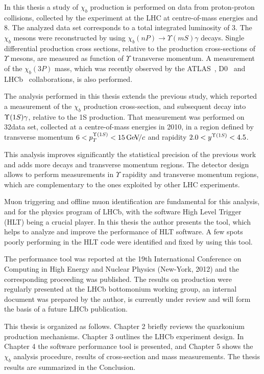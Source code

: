 In this thesis a study of $\chi_b$ production is performed on data from proton-proton collisions, 
collected by the \lhcb experiment at the LHC at centre-of-mass energies 
 and 8\tev. The analyzed data set corresponds to a total integrated luminosity
of 3\invfb. The $\chi_b$ mesons were reconstructed by using 
$\chi_b(nP)\rightarrow\Upsilon(mS)\gamma$ decays. Single differential
production cross sections, relative to the production cross-sections of
$\Upsilon$ mesons, are measured as function of $\Upsilon$ transverse momentum.
A measurement of the $\chi_b(3P)$ mass, which was recently observed by the 
ATLAS~\cite{Aad:2011ih}, D0~\cite{Abazov:2012gh} and
LHCb~\cite{LHCb-CONF-2012-020} collaborations, is also performed.

The analysis performed in this thesis extends the previous \lhcb
study\cite{LHCb-PAPER-2012-015}, which reported a measurement of the $\chi_b$
production cross-section, and subsequent decay into $\Y1S \gamma$, relative
to the \Y1S production. That measurement was performed on 32\invpb data set,
collected at a centre-of-mass energies \tev in 2010,  in a region defined by
transverse momentum $6  < p_{T}^{\Y1S} < 15 \gevc$ and rapidity  $2.0 <
y^{\Y1S} < 4.5$. 

This analysis improves significantly the statistical precision of the previous work and 
adds more decays and transverse momentum regions. The
\lhcb detector design allows to perform measurements in $\Upsilon$ rapidity and 
transverse momentum regions, which are complementary to the ones exploited 
by other LHC experiments. 

Muon triggering and offline muon identification are fundamental for this analysis, and 
for the physics program of LHCb, with the software High Level Trigger (HLT) being 
a crucial player. In this thesis the author presents the tool, which helps to
analyze and improve the performance of HLT software. A few spots poorly performing 
in the HLT code were identified and fixed by using this tool.

The performance tool was reported at the 19th International
Conference on Computing in High Energy and Nuclear Physics (New-York, 2012) and
the corresponding proceeding was published\cite{aprofiler}. The results on
\chib production were regularly presented at the LHCb bottomonium working group,
an internal document was prepared by the author, is currently under review and will form 
the basis of a future LHCb publication.

This thesis is organized as follows. Chapter 2 briefly reviews the quarkonium
production mechanisms. Chapter 3 outlines the LHCb experiment design. In
Chapter 4 the software performance tool is presented, and Chapter 5 shows the
$\chi_b$ analysis procedure, results of cross-section and \chibThreeP mass
measurements. The thesis results are summarized in the Conclusion.
